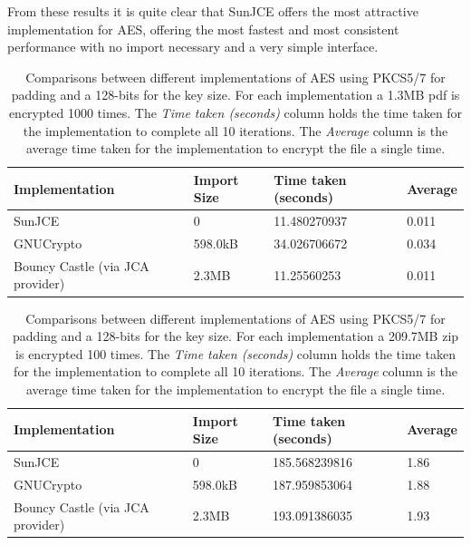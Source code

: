 \documentclass[12pt, titlepage]{article}
\begin{document}
\newline \indent From these results it is quite clear that SunJCE offers the most attractive implementation for AES, offering the most fastest and most consistent performance with no import necessary and a very simple interface.
\begin{center}
\begin{table}
    \begin{tabular}{ | l | l | l | l |}
    \hline
    \textbf{Implementation} & \textbf{Import Size} & \textbf{Time taken (seconds)} & \textbf{Average} \\ \hline
    
    SunJCE & 0 & 11.480270937  &  0.011 \\ \hline
    
    GNUCrypto & 598.0kB & 34.026706672  & 0.034 \\ \hline
    
    Bouncy Castle (via JCA provider) & 2.3MB & 11.25560253 & 0.011 \\ \hline
    
    \end{tabular}
    \caption{Comparisons between different implementations of AES using PKCS5/7 for padding and a 128-bits for the key size. For each implementation a 1.3MB pdf is encrypted 1000 times. The \textit{Time taken (seconds)} column holds the time taken for the implementation to complete all 10 iterations. The \textit{Average} column is the average time taken for the implementation to encrypt the file a single time.} \label{tab:aespdfComparison}
    \end{table}
\end{center}

\begin{center}
\begin{table}
    \begin{tabular}{ | l | l | l | l |}
    \hline
    \textbf{Implementation} & \textbf{Import Size} & \textbf{Time taken (seconds)} & \textbf{Average} \\ \hline
    
    SunJCE & 0 & 185.568239816 & 1.86 \\ \hline
    
    GNUCrypto & 598.0kB & 187.959853064 & 1.88 \\ \hline
    
    Bouncy Castle (via JCA provider) & 2.3MB & 193.091386035 & 1.93 \\ \hline
    
    \end{tabular}
    \caption{Comparisons between different implementations of AES using PKCS5/7 for padding and a 128-bits for the key size. For each implementation a 209.7MB zip is encrypted 100 times. The \textit{Time taken (seconds)} column holds the time taken for the implementation to complete all 10 iterations. The \textit{Average} column is the average time taken for the implementation to encrypt the file a single time.} \label{tab:aeszipComparison}
    \end{table}
\end{center}
\end{document}
